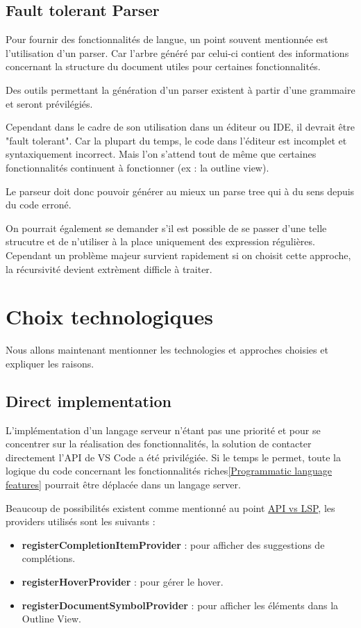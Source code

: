 \documentclass[
    iict, %
    il, %
]{heig-tb}
\begin{document}
\subsection{Fault tolerant Parser}
Pour fournir des fonctionnalités de langue, un point souvent mentionnée est l'utilisation d'un parser.
Car l'arbre généré par celui-ci contient des informations concernant la structure du document utiles pour certaines fonctionnalités.

Des outils permettant la génération d'un parser existent à partir d'une grammaire et seront prévilégiés.

Cependant dans le cadre de son utilisation dans un éditeur ou IDE, il devrait être "fault tolerant".
Car la plupart du temps, le code dans l'éditeur est incomplet et syntaxiquement incorrect.
Mais l'on s'attend tout de même que certaines fonctionnalités continuent à fonctionner (ex : la outline view).

Le parseur doit donc pouvoir générer au mieux un parse tree qui à du sens depuis du code erroné.

On pourrait également se demander s'il est possible de se passer d'une telle strucutre et de n'utiliser à la place uniquement des expression régulières.
Cependant un problème majeur survient rapidement si on choisit cette approche, la récursivité devient extrèment difficle à traiter. \cite{antlr-mega-tutorial}


\section{Choix technologiques}
Nous allons maintenant mentionner les technologies et approches choisies et expliquer les raisons.

\subsection{Direct implementation}
L'implémentation d'un langage serveur n'étant pas une priorité et pour se concentrer sur la réalisation des fonctionnalités, la solution de contacter directement l'API de VS Code a été privilégiée.
Si le temps le permet, toute la logique du code concernant les fonctionnalités riches\ref{Programmatic language features} pourrait être déplacée dans un langage server.

Beaucoup de possibilités existent comme mentionné au point \hyperref[api vs lsp]{API vs LSP}, les providers utilisés sont les suivants :
\begin{itemize}
    \item \textbf{registerCompletionItemProvider} : pour afficher des suggestions de complétions.
    \item \textbf{registerHoverProvider} : pour gérer le hover.
    \item \textbf{registerDocumentSymbolProvider} : pour afficher les éléments dans la Outline View.
\end{itemize}
\end{document}
